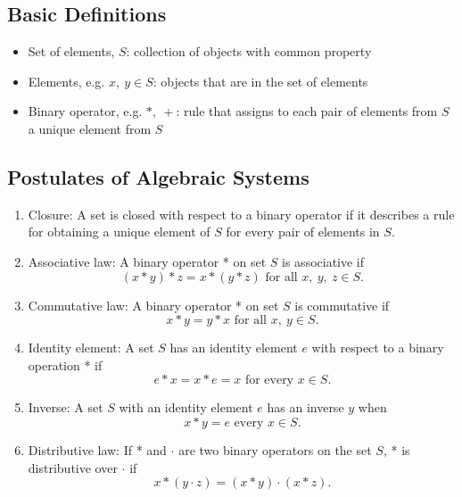 \documentclass[a4paper]{article}
\begin{document}
\subsection{Basic Definitions}
\begin{itemize}
    \item Set of elements, $S$: collection of objects with common property
    \item Elements, e.g. $x,\ y\in S$: objects that are in the set of elements
    \item Binary operator, e.g. $*,\ +$: rule that assigns to each pair of elements from $S$ a unique element from $S$
\end{itemize}

\subsection{Postulates of Algebraic Systems}
\begin{enumerate}
    \item Closure: A set is closed with respect to a binary operator if it describes a rule for obtaining a unique element of $S$ for every pair of elements in $S$.
    \item Associative law: A binary operator * on set $S$ is associative if $$(x*y)*z = x*(y*z)\text{ for all }x,\ y,\ z \in S.$$
    \item Commutative law: A binary operator * on set $S$ is commutative if $$x*y = y*x\text{ for all }x,\ y \in S.$$
    \item Identity element: A set $S$ has an identity element $e$ with respect to a binary operation * if $$e*x = x*e = x\text{ for every }x\in S.$$
    \item Inverse: A set $S$ with an identity element $e$ has an inverse $y$ when $$x*y = e\text{ every }x\in S.$$
    \item Distributive law: If * and $\cdot$ are two binary operators on the set $S$, * is distributive over $\cdot$ if $$x*(y\cdot z) = (x*y)\cdot(x*z).$$
\end{enumerate}
\end{document}
